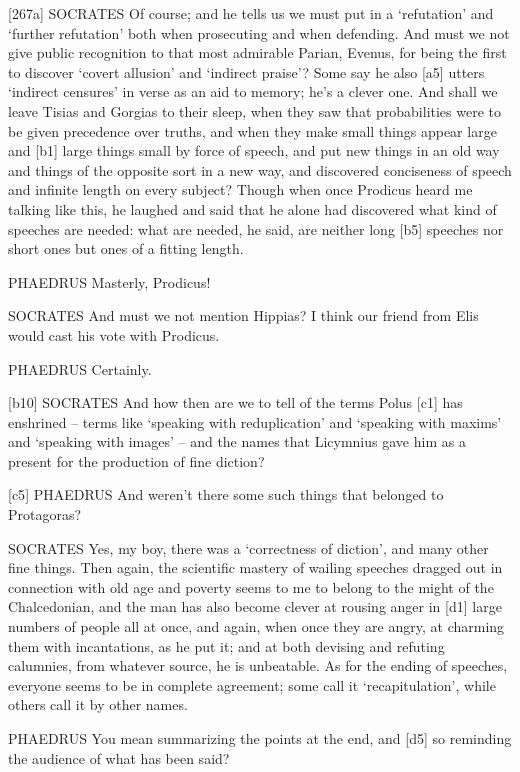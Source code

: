 {[}267a{]} SOCRATES Of course; and he tells us we must put in a
‘refutation' and ‘further refutation' both when prosecuting and when
defending. And must we not give public recognition to that most
admirable Parian, Evenus, for being the first to discover ‘covert
allusion' and ‘indirect praise'? Some say he also {[}a5{]} utters
‘indirect censures' in verse as an aid to memory; he's a clever one. And
shall we leave Tisias and Gorgias to their sleep, when they saw that
probabilities were to be given precedence over truths, and when they
make small things appear large and {[}b1{]} large things small by
force of speech, and put
new things in an old way and things of the opposite sort in a new way,
and discovered conciseness of speech and infinite length on every
subject? Though when once Prodicus heard me talking like this, he
laughed and said that he alone had discovered what kind of speeches are
needed: what are needed, he said, are neither long {[}b5{]} speeches nor
short ones but ones of a fitting length.

PHAEDRUS Masterly, Prodicus!

SOCRATES And must we not mention Hippias? I think our friend from Elis
would cast his vote with Prodicus.

PHAEDRUS Certainly.

{[}b10{]} SOCRATES And how then are we to tell of the terms Polus
{[}c1{]} has enshrined -- terms like ‘speaking with reduplication' and
‘speaking with maxims' and ‘speaking with images' -- and the names that
Licymnius gave him as a present for the production of fine diction?

{[}c5{]} PHAEDRUS And weren't there some such things that belonged to
Protagoras?

SOCRATES Yes, my boy, there was a ‘correctness of diction', and many
other fine things. Then again, the scientific mastery of wailing
speeches dragged out in connection with old age and poverty seems to me
to belong to the might of the
Chalcedonian, and the
man has also become clever at rousing anger in {[}d1{]} large numbers of
people all at once, and again, when once they are angry, at charming
them with incantations, as he put it; and at both devising and refuting
calumnies, from whatever source, he is unbeatable. As for the ending of
speeches, everyone seems to be in complete agreement; some call it
‘recapitulation', while others call it by other names.

PHAEDRUS You mean summarizing the points at the end, and {[}d5{]} so
reminding the audience of what has been said?

